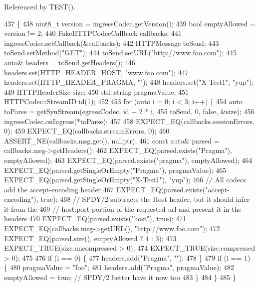 Referenced by T\+E\+S\+T().


\begin{DoxyCode}
437                                                                        \{
438   uint8\_t version = ingressCodec.getVersion();
439   \textcolor{keywordtype}{bool} emptyAllowed = version != 2;
440   FakeHTTPCodecCallback callbacks;
441   ingressCodec.setCallback(&callbacks);
442   HTTPMessage toSend;
443   toSend.setMethod(\textcolor{stringliteral}{"GET"});
444   toSend.setURL(\textcolor{stringliteral}{"http://www.foo.com"});
445   \textcolor{keyword}{auto}& headers = toSend.getHeaders();
446   headers.set(HTTP\_HEADER\_HOST, \textcolor{stringliteral}{"www.foo.com"});
447   headers.set(HTTP\_HEADER\_PRAGMA, \textcolor{stringliteral}{""});
448   headers.set(\textcolor{stringliteral}{"X-Test1"}, \textcolor{stringliteral}{"yup"});
449   HTTPHeaderSize size;
450   std::string pragmaValue;
451   HTTPCodec::StreamID id(1);
452 
453   \textcolor{keywordflow}{for} (\textcolor{keyword}{auto} i = 0; i < 3; i++) \{
454     \textcolor{keyword}{auto} toParse = getSynStream(egressCodec, \textcolor{keywordtype}{id} + 2 * i,
455                                 toSend, 0, \textcolor{keyword}{false}, &size);
456     ingressCodec.onIngress(*toParse);
457 
458     EXPECT\_EQ(callbacks.sessionErrors, 0);
459     EXPECT\_EQ(callbacks.streamErrors, 0);
460     ASSERT\_NE(callbacks.msg.get(), \textcolor{keyword}{nullptr});
461     \textcolor{keyword}{const} \textcolor{keyword}{auto}& parsed = callbacks.msg->getHeaders();
462     EXPECT\_EQ(parsed.exists(\textcolor{stringliteral}{"Pragma"}), emptyAllowed);
463     EXPECT\_EQ(parsed.exists(\textcolor{stringliteral}{"pragma"}), emptyAllowed);
464     EXPECT\_EQ(parsed.getSingleOrEmpty(\textcolor{stringliteral}{"Pragma"}), pragmaValue);
465     EXPECT\_EQ(parsed.getSingleOrEmpty(\textcolor{stringliteral}{"X-Test1"}), \textcolor{stringliteral}{"yup"});
466     \textcolor{comment}{// All codecs add the accept-encoding header}
467     EXPECT\_EQ(parsed.exists(\textcolor{stringliteral}{"accept-encoding"}), \textcolor{keyword}{true});
468     \textcolor{comment}{// SPDY/2 subtracts the Host header, but it should infer it from the}
469     \textcolor{comment}{// host:port portion of the requested url and present it in the headers}
470     EXPECT\_EQ(parsed.exists(\textcolor{stringliteral}{"host"}), \textcolor{keyword}{true});
471     EXPECT\_EQ(callbacks.msg->getURL(), \textcolor{stringliteral}{"http://www.foo.com"});
472     EXPECT\_EQ(parsed.size(), emptyAllowed ? 4 : 3);
473     EXPECT\_TRUE(size.uncompressed > 0);
474     EXPECT\_TRUE(size.compressed > 0);
475 
476     \textcolor{keywordflow}{if} (i == 0) \{
477       headers.add(\textcolor{stringliteral}{"Pragma"}, \textcolor{stringliteral}{""});
478     \}
479     \textcolor{keywordflow}{if} (i == 1) \{
480       pragmaValue = \textcolor{stringliteral}{"foo"};
481       headers.add(\textcolor{stringliteral}{"Pragma"}, pragmaValue);
482       emptyAllowed = \textcolor{keyword}{true}; \textcolor{comment}{// SPDY/2 better have it now too}
483     \}
484   \}
485 \}
\end{DoxyCode}
